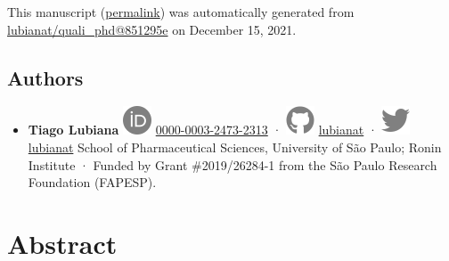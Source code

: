 This manuscript
(\href{https://lubianat.github.io/quali_phd/v/851295e93a8879e9354aca9a13f1b9884a7be405/}{permalink})
was automatically generated
from \href{https://github.com/lubianat/quali_phd/tree/851295e93a8879e9354aca9a13f1b9884a7be405}{lubianat/quali\_phd@851295e}
on December 15, 2021.

\hypertarget{authors}{%
\subsection{Authors}\label{authors}}

\begin{itemize}
\tightlist
\item
  \textbf{Tiago Lubiana}
  \includegraphics{images/orcid.svg}
  \href{https://orcid.org/0000-0003-2473-2313}{0000-0003-2473-2313}
  · \includegraphics{images/github.svg}
  \href{https://github.com/lubianat}{lubianat}
  · \includegraphics{images/twitter.svg}
  \href{https://twitter.com/lubianat}{lubianat}
  School of Pharmaceutical Sciences, University of São Paulo; Ronin Institute
  · Funded by Grant \#2019/26284-1 from the São Paulo Research Foundation (FAPESP).
\end{itemize}

\hypertarget{abstract}{%
\section{Abstract}\label{abstract}}

